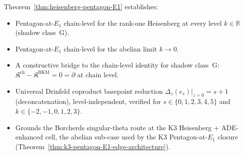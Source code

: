 \begin{remark}
\label{rem:heisenberg-pentagon-consequences}
Theorem~\ref{thm:heisenberg-pentagon-E1} establishes:
\begin{itemize}
\item Pentagon-at-$E_1$ chain-level for the rank-one Heisenberg at
 every level $k \in \mathbb{R}$ (shadow class~G).
\item Pentagon-at-$E_1$ chain-level for the abelian limit $k \to 0$.
\item A constructive bridge to the chain-level identity for
 shadow class~G:
 $\mathfrak{K}^{\mathrm{ch}} - \mathfrak{K}^{\mathrm{BKM}} = 0
 = \partial$ at chain level.
\item Universal Drinfeld coproduct basepoint reduction
 $\Delta_z(e_s)|_{z = 0} = s + 1$ (deconcatenation),
 level-independent, verified for $s \in \{0, 1, 2, 3, 4, 5\}$
 and $k \in \{-2, -1, 0, 1, 2, 3\}$.
\item Grounds the Borcherds singular-theta route at the K$3$
 Heisenberg + ADE-enhanced cell, the abelian sub-case used by
 the K$3$ Pentagon-at-$E_1$ closure
 \textup{(}Theorem~\ref{thm:k3-pentagon-E1-edge-architecture}\textup{).}
\end{itemize}
\end{remark}

